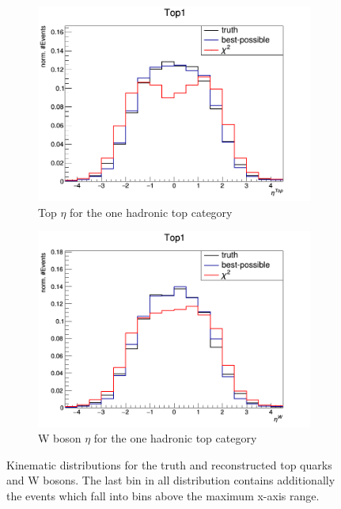 \begin{figure}[H]
\begin{subfigure}{.5\textwidth}
  \includegraphics[width=.99\linewidth]{figs/HadTop/etatop}
  \caption{Top $\eta$ for the one hadronic top category}
  \label{fig:etat}
\end{subfigure}%
\begin{subfigure}{.5\textwidth}
  \centering
  \includegraphics[width=.99\linewidth]{figs/HadTop/etaW}
  \caption{W boson $\eta$ for the one hadronic top category}
  \label{fig:etaW}
\end{subfigure}
\caption{Kinematic distributions for the truth and reconstructed top quarks and W bosons. The last bin in all distribution contains additionally the events which fall into bins above the maximum x-axis range.}
\label{fig:kinReco}
\end{figure}
